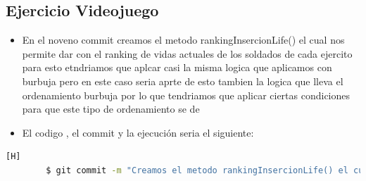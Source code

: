 \documentclass{article}
\begin{document}
	\subsection{Ejercicio Videojuego}
	\begin{itemize}	
		\item En el noveno commit creamos el metodo rankingInsercionLife() el cual nos permite dar con el ranking de vidas actuales de los soldados de cada ejercito para esto etndriamos que aplcar casi la misma logica que aplicamos con burbuja pero en este caso seria aprte de esto tambien la logica que lleva el ordenamiento burbuja por lo que tendriamos que aplicar ciertas condiciones para que este tipo de ordenamiento se de
		\item El codigo , el commit y la ejecución seria el siguiente:
	\end{itemize}	
	\begin{lstlisting}[language=bash,caption={Commit}][H]
		$ git commit -m "Creamos el metodo rankingInsercionLife() el cual nos permite dar con el ranking de vidas actuales de los soldados de cada ejercito para esto etndriamos que aplcar casi la misma logica que aplicamos con burbuja pero en este caso seria aprte de esto tambien la logica que lleva el ordenamiento burbuja por lo que tendriamos que aplicar ciertas condiciones para que este tipo de ordenamiento se de"
	\end{lstlisting}	
\end{document}
